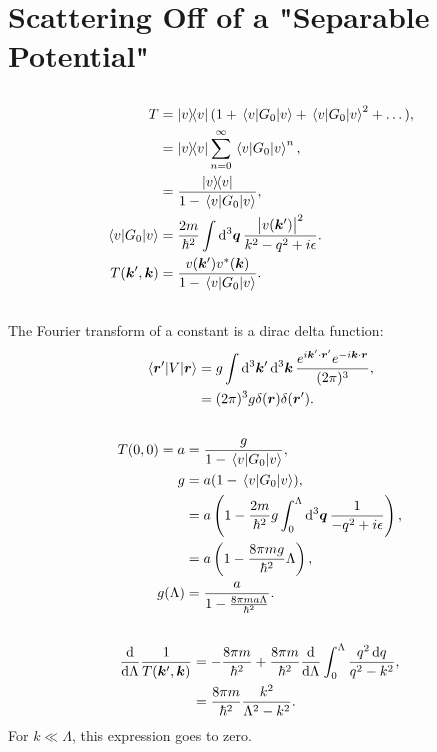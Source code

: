 \documentclass[
a4paper,
10pt,
twoside,
]{article}
\begin{document}
\section{Scattering Off of a "Separable Potential"}\label{sec: III}
\subsection{}\label{ssec: IIIa}

\begin{align}
	T
		&= \op{v}(1+\ev{G_0}{v}+\ev{G_0}{v}^2+\dots),\\
		&= \op{v}\sum_{n=0}^\infty \ev{G_0}{v}^n,\\
		&= \frac{\op{v}}{1-\ev{G_0}{v}},\\
	\ev{G_0}{v}
		&= \frac{2m}{\hbar^2} \int \dd[3]{\bm{q}} \frac{\abs{v(\bm{k}')}^2}{k^2 - q^2 + i\epsilon}.\\
	T(\bm{k}',\bm{k})
		&= \frac{v(\bm{k}')v^*(\bm{k})}{1-\ev{G_0}{v}}.
\end{align}

\subsection{}\label{ssec: IIIb}

The Fourier transform of a constant is a dirac delta function:
\begin{align}
	\mel*{\bm{r}'}{V}{\bm{r}}
		&= g\int\dd[3]{\bm{k}'}\dd[3]{\bm{k}} \frac{e^{i\bm{k}'\cdot\bm{r}'}e^{-i\bm{k}\cdot\bm{r}}}{(2\pi)^3},\\
		&= (2\pi)^3 g \delta(\bm{r}) \delta(\bm{r}').
\end{align}

\subsection{}\label{ssec: IIIc}


\begin{align}
	T(0,0) = a
		&= \frac{g}{1-\ev{G_0}{v}},\\
	g
		&= a(1-\ev{G_0}{v}),\\
		&= a\left(1 - \frac{2m}{\hbar^2}g \int_0^\Lambda \dd[3]{\bm{q}} \frac{1}{- q^2 + i\epsilon}\right),\\
		&= a\left(1 - \frac{8\pi m g}{\hbar^2}\Lambda\right),\\
	g(\Lambda)
		&= \frac{a}{1-\frac{8\pi m a \Lambda}{\hbar^2}}.
\end{align}


\subsection{}\label{ssec: IIId}


\begin{align}
	\dv{\Lambda} \frac{1}{T(\bm{k}',\bm{k})}
		&= -\frac{8\pi m}{\hbar^2} + \frac{8\pi m}{\hbar^2} \dv{\Lambda}\int_{0}^{\Lambda} \frac{q^2\dd{q}}{q^2-k^2},\\
		&= \frac{8\pi m}{\hbar^2} \frac{k^2}{\Lambda^2-k^2}.
\end{align}
For $k\ll\Lambda$, this expression goes to zero.


\stopmcols
\end{document}
